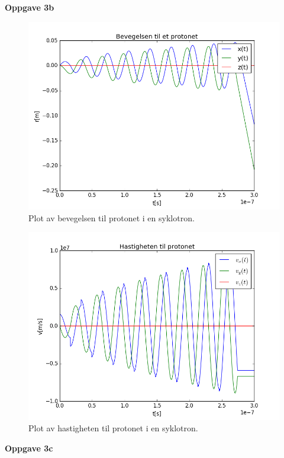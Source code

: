 \documentclass[a4paper,norsk,12pt]{article}
\begin{document}
\textbf{Oppgave 3b}

\begin{figure}[H]
  \includegraphics[width=\linewidth]{oppgave32.png}
  \caption{Plot av bevegelsen til protonet i en syklotron.}
  \label{fig:plot7}
\end{figure}


\begin{figure}[H]
  \includegraphics[width=\linewidth]{oppgave33.png}
  \caption{Plot av hastigheten til protonet i en syklotron.}
  \label{fig:plot8}
\end{figure}

\hspace{1cm}

\textbf{Oppgave 3c}
\end{document}
